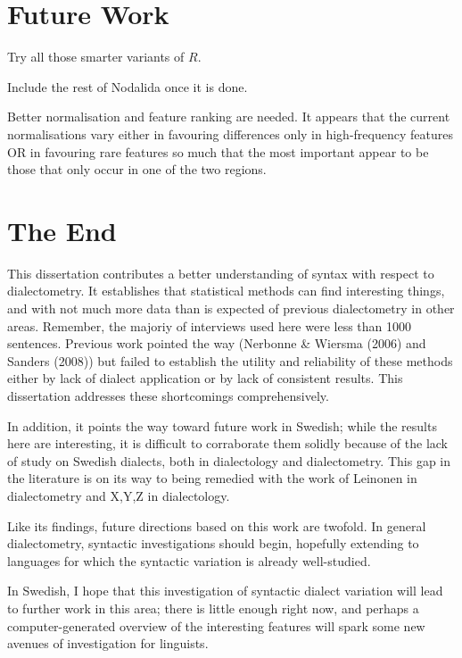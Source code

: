 \section{Future Work}

Try all those smarter variants of $R$.

Include the rest of Nodalida once it is done.

Better normalisation and feature ranking are needed. It appears that
the current normalisations vary either in favouring differences
only in high-frequency features OR in favouring rare features so much
that the most important appear to be those that only occur in one of
the two regions.

\section{The End}

This dissertation contributes a better understanding of syntax with
respect to dialectometry. It establishes that statistical methods can
find interesting things, and with not much more data than is expected
of previous dialectometry in other areas. Remember, the majoriy of
interviews used here were less than 1000 sentences. Previous work
pointed the way (Nerbonne \& Wiersma (2006) and Sanders (2008)) but
failed to establish the utility and reliability of these methods
either by lack of dialect application or by lack of consistent
results. This dissertation addresses these shortcomings
comprehensively.

In addition, it points the way toward future work in Swedish; while
the results here are interesting, it is difficult to corraborate them
solidly because of the lack of study on Swedish dialects, both in
dialectology and dialectometry. This gap in the literature is on its
way to being remedied with the work of Leinonen in dialectometry and
X,Y,Z in dialectology.

Like its findings, future directions based on this work are
twofold. In general dialectometry, syntactic investigations should
begin, hopefully extending to languages for which the syntactic
variation is already well-studied.

In Swedish, I hope that this investigation of syntactic dialect
variation will lead to further work in this area; there is little
enough right now, and perhaps a computer-generated overview of the
interesting features will spark some new avenues of investigation for
linguists.

